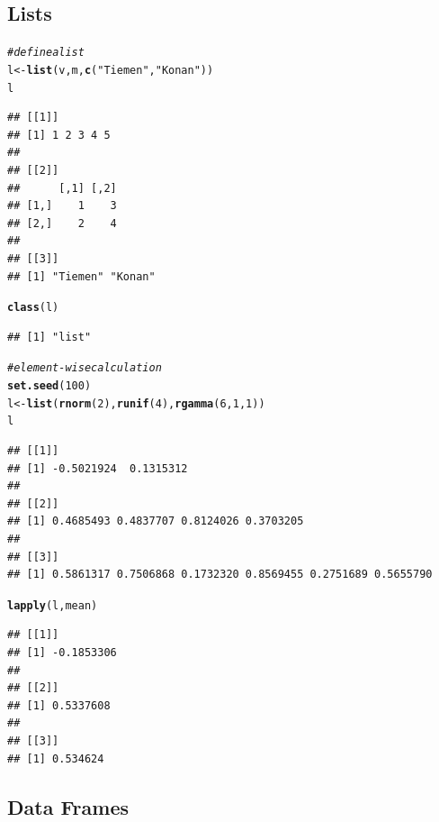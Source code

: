 \documentclass[11pt]{article}\usepackage[]{graphicx}\usepackage[]{color}
\makeatletter
\newcommand{\hlnum}[1]{\textcolor[rgb]{0.686,0.059,0.569}{#1}}%
\newcommand{\hlstr}[1]{\textcolor[rgb]{0.192,0.494,0.8}{#1}}%
\newcommand{\hlcom}[1]{\textcolor[rgb]{0.678,0.584,0.686}{\textit{#1}}}%
\newcommand{\hlstd}[1]{\textcolor[rgb]{0.345,0.345,0.345}{#1}}%
\newcommand{\hlkwb}[1]{\textcolor[rgb]{0.69,0.353,0.396}{#1}}%
\newcommand{\hlkwd}[1]{\textcolor[rgb]{0.737,0.353,0.396}{\textbf{#1}}}%
\newenvironment{kframe}{%
 \def\at@end@of@kframe{}%
 \ifinner\ifhmode%
  \def\at@end@of@kframe{\end{minipage}}%
  \begin{minipage}{\columnwidth}%
 \fi\fi%
 \def\FrameCommand##1{\hskip\@totalleftmargin \hskip-\fboxsep
 \colorbox{shadecolor}{##1}\hskip-\fboxsep
     \hskip-\linewidth \hskip-\@totalleftmargin \hskip\columnwidth}%
 \MakeFramed {\advance\hsize-\width
   \@totalleftmargin\z@ \linewidth\hsize
   \@setminipage}}%
 {\par\unskip\endMakeFramed%
 \at@end@of@kframe}
\newenvironment{knitrout}{}{} %
\makeatother
\begin{document}
\subsection{Lists}

\begin{knitrout}
\color{fgcolor}\begin{kframe}
\begin{alltt}
\hlcom{# define a list}
\hlstd{l} \hlkwb{<-} \hlkwd{list}\hlstd{(v,m,}\hlkwd{c}\hlstd{(}\hlstr{"Tiemen"}\hlstd{,}\hlstr{"Konan"}\hlstd{))}
\hlstd{l}
\end{alltt}
\begin{verbatim}
## [[1]]
## [1] 1 2 3 4 5
## 
## [[2]]
##      [,1] [,2]
## [1,]    1    3
## [2,]    2    4
## 
## [[3]]
## [1] "Tiemen" "Konan"
\end{verbatim}
\begin{alltt}
\hlkwd{class}\hlstd{(l)}
\end{alltt}
\begin{verbatim}
## [1] "list"
\end{verbatim}
\begin{alltt}
\hlcom{# element-wise calculation}
\hlkwd{set.seed}\hlstd{(}\hlnum{100}\hlstd{)}
\hlstd{l} \hlkwb{<-} \hlkwd{list}\hlstd{(}\hlkwd{rnorm}\hlstd{(}\hlnum{2}\hlstd{),} \hlkwd{runif}\hlstd{(}\hlnum{4}\hlstd{),} \hlkwd{rgamma}\hlstd{(}\hlnum{6}\hlstd{,}\hlnum{1}\hlstd{,}\hlnum{1}\hlstd{))}
\hlstd{l}
\end{alltt}
\begin{verbatim}
## [[1]]
## [1] -0.5021924  0.1315312
## 
## [[2]]
## [1] 0.4685493 0.4837707 0.8124026 0.3703205
## 
## [[3]]
## [1] 0.5861317 0.7506868 0.1732320 0.8569455 0.2751689 0.5655790
\end{verbatim}
\begin{alltt}
\hlkwd{lapply}\hlstd{(l, mean)}
\end{alltt}
\begin{verbatim}
## [[1]]
## [1] -0.1853306
## 
## [[2]]
## [1] 0.5337608
## 
## [[3]]
## [1] 0.534624
\end{verbatim}
\end{kframe}
\end{knitrout}

\subsection{Data Frames}
\end{document}
